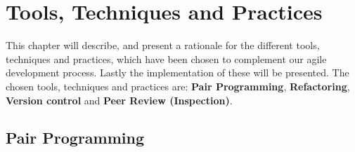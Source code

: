 
\chapter{Tools, Techniques and Practices} %
\label{cha:tools_techniques_and_practices}
This chapter will describe, and present a rationale for the different tools, techniques and practices, which have been chosen to complement our agile development process.
Lastly the implementation of these will be presented.
The chosen tools, techniques and practices are: \textbf{Pair Programming}, \textbf{Refactoring}, \textbf{Version control} and \textbf{Peer Review (Inspection)}.

\section*{Pair Programming} %
\label{sec:pair_programming}
